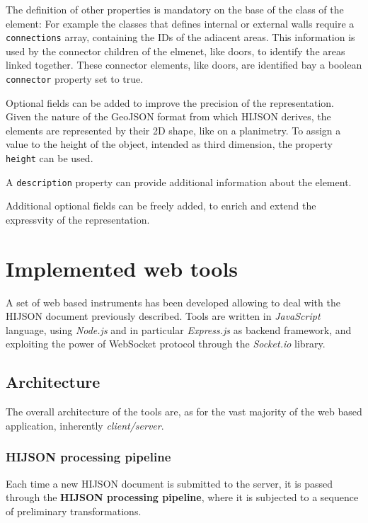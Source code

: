 \documentclass{sig-alternate}
\begin{document}
The definition of other properties is mandatory on the base of the class
of the element: For example the classes that defines internal or
external walls require a \texttt{connections} array, containing the IDs
of the adiacent areas. This information is used by the connector
children of the elmenet, like doors, to identify the areas linked
together. These connector elements, like doors, are identified bay a
boolean \texttt{connector} property set to true.

Optional fields can be added to improve the precision of the
representation. Given the nature of the GeoJSON format from which HIJSON
derives, the elements are represented by their 2D shape, like on a
planimetry. To assign a value to the height of the object, intended as
third dimension, the property \texttt{height} can be used.

A \texttt{description} property can provide additional information about
the element.

Additional optional fields can be freely added, to enrich and extend the
expressvity of the representation.

\section{Implemented web tools}\label{implemented-web-tools}

A set of web based instruments has been developed allowing to deal with
the HIJSON document previously described. Tools are written in
\emph{JavaScript} language, using \emph{Node.js} and in particular
\emph{Express.js} as backend framework, and exploiting the power of
WebSocket protocol through the \emph{Socket.io} library.

\subsection{Architecture}\label{architecture}

The overall architecture of the tools are, as for the vast majority of
the web based application, inherently \emph{client/server}.

\subsubsection{HIJSON processing pipeline}\label{hijson-processing-pipeline}

Each time a new HIJSON document is submitted to the server, it is passed
through the \textbf{HIJSON processing pipeline}, where it is subjected
to a sequence of preliminary transformations.
\end{document}
